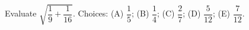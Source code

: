 Evaluate $\sqrt{\dfrac{1}{9}+\dfrac{1}{16}}$. Choices: (A) $\dfrac{1}{5}$; (B) $\dfrac{1}{4}$; (C) $\dfrac{2}{7}$; (D) $\dfrac{5}{12}$; (E) $\dfrac{7}{12}$.
